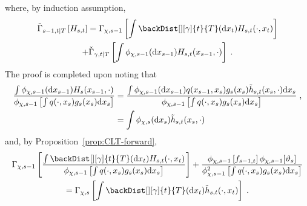 where, by induction assumption,
\begin{multline*}
\asymVarJoint{s-1,t}{T}{H_{s,t}} = \asymVar[\Xinit]{s-1}{\int \backDist[][\gamma]{t}{T}(\rmd x_t)H_{s,t}(\cdot,x_t)} \\
+ \backasymVar[\gamma]{t}{T}{\int \filt{\Xinit,s-1}(\rmd x_{s-1})H_{s,t}(x_{s-1},\cdot)}\eqsp.
\end{multline*}
The proof is completed upon noting that
\begin{align*}
\frac{\int \filt{\Xinit,s-1}(\rmd x_{s-1})H_s(x_{s-1},\cdot)}{\filt{\chi,s-1}\left[\int q(\cdot,x_s)g_s(x_s)\rmd x_s\right]} &= \frac{\int \filt{\Xinit,s-1}(\rmd x_{s-1})q(x_{s-1},x_s)g_s(x_s)\tilde{h}_{s,t}(x_s,\cdot)\rmd x_s}{\filt{\chi,s-1}\left[\int q(\cdot,x_s)g_s(x_s)\rmd x_s\right]}\eqsp,\\
&= \int \filt{\Xinit,s}(\rmd x_{s})\tilde{h}_{s,t}(x_s,\cdot)
\end{align*}
and, by Proposition~\ref{prop:CLT-forward},
\begin{multline*}
\asymVar[\Xinit]{s-1}{\frac{\int \backDist[][\gamma]{t}{T}(\rmd x_t)H_{s,t}(\cdot,x_t)}{\filt{\chi,s-1}\left[\int q(\cdot,x_s)g_s(x_s)\rmd x_s\right]}} + \frac{\filt{\Xinit,s-1}\left[f_{s-1,t}\right]\filt{\chi,s-1}[\adjfuncforward{s}]}{\filt{\chi,s-1}^2\left[\int q(\cdot,x_s)g_s(x_s)\rmd x_s\right]} \\
= \asymVar[\Xinit]{s}{\int \backDist[][\gamma]{t}{T}(\rmd x_t)\tilde{h}_{s,t}(\cdot,x_t)}\eqsp.
\end{multline*}
